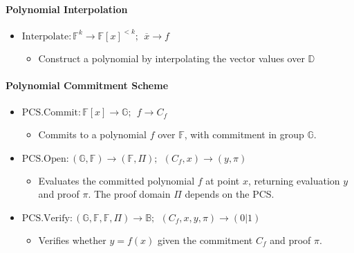 \documentclass[
]{article}
\providecommand{\tightlist}{%
  \setlength{\itemsep}{0pt}\setlength{\parskip}{0pt}}
\begin{document}
\hypertarget{polynomial-interpolation}{%
\paragraph{Polynomial Interpolation}\label{polynomial-interpolation}}

\begin{itemize}
\tightlist
\item
  \(\text{Interpolate}: \mathbb{F}^k \rightarrow \mathbb{F}[x]^{< k};\ \ \overline{x} \rightarrow f\)

  \begin{itemize}
  \tightlist
  \item
    Construct a polynomial by interpolating the vector values over
    \(\mathbb{D}\)
  \end{itemize}
\end{itemize}

\hypertarget{polynomial-commitment-scheme}{%
\paragraph{Polynomial Commitment
Scheme}\label{polynomial-commitment-scheme}}

\begin{itemize}
\tightlist
\item
  \(\text{PCS.Commit}: \mathbb{F}[x] \rightarrow \mathbb{G};\ \ f \rightarrow C_f\)

  \begin{itemize}
  \tightlist
  \item
    Commits to a polynomial \(f\) over \(\mathbb{F}\), with commitment
    in group \(\mathbb{G}\).
  \end{itemize}
\item
  \(\text{PCS.Open}: (\mathbb{G}, \mathbb{F}) \rightarrow (\mathbb{F}, \Pi);\ \ (C_f, x) \rightarrow (y,\pi)\)

  \begin{itemize}
  \tightlist
  \item
    Evaluates the committed polynomial \(f\) at point \(x\), returning
    evaluation \(y\) and proof \(\pi\). The proof domain \(\Pi\) depends
    on the PCS.
  \end{itemize}
\item
  \(\text{PCS.Verify}: (\mathbb{G}, \mathbb{F}, \mathbb{F}, \Pi) \rightarrow \mathbb{B};\ \ (C_f,x,y ,\pi) \rightarrow (0|1)\)

  \begin{itemize}
  \tightlist
  \item
    Verifies whether \(y = f(x)\) given the commitment \(C_f\) and proof
    \(\pi\).
  \end{itemize}
\end{itemize}
\end{document}
